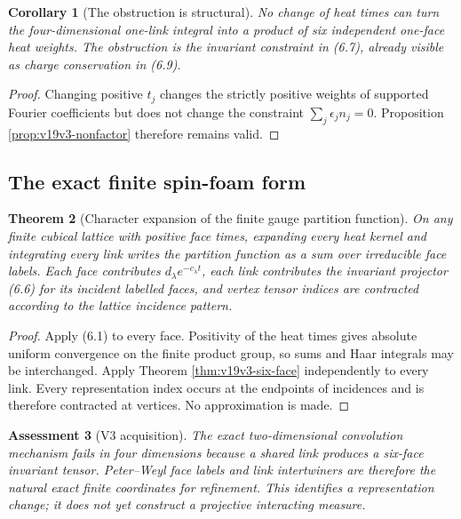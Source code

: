 \documentclass[11pt]{article}
\newtheorem{theorem}{Theorem}[section]
\newtheorem{corollary}[theorem]{Corollary}
\newtheorem{assessment}[theorem]{Assessment}
\theoremstyle{remark}
\begin{document}
\begin{corollary}[The obstruction is structural]
\label{cor:v19v3-structural}
No change of heat times can turn the four-dimensional one-link integral
into a product of six independent one-face heat weights.  The obstruction
is the invariant constraint in (6.7), already visible as charge
conservation in (6.9).
\end{corollary}

\begin{proof}
Changing positive \(t_j\) changes the strictly positive weights of supported
Fourier coefficients but does not change the constraint
\(\sum_j\epsilon_jn_j=0\).  Proposition
\ref{prop:v19v3-nonfactor} therefore remains valid.
\end{proof}

\subsection{The exact finite spin-foam form}

\begin{theorem}[Character expansion of the finite gauge partition function]
\label{thm:v19v3-spin-foam}
On any finite cubical lattice with positive face times, expanding every
heat kernel and integrating every link writes the partition function as a
sum over irreducible face labels.  Each face contributes
\(d_\lambda e^{-c_\lambda t}\), each link contributes the invariant
projector (6.6) for its incident labelled faces, and vertex tensor indices
are contracted according to the lattice incidence pattern.
\end{theorem}

\begin{proof}
Apply (6.1) to every face.  Positivity of the heat times gives absolute
uniform convergence on the finite product group, so sums and Haar integrals
may be interchanged.  Apply Theorem \ref{thm:v19v3-six-face} independently
to every link.  Every representation index occurs at the endpoints of
incidences and is therefore contracted at vertices.  No approximation is
made.
\end{proof}

\begin{assessment}[V3 acquisition]
\label{ass:v19v3}
The exact two-dimensional convolution mechanism fails in four dimensions
because a shared link produces a six-face invariant tensor.  Peter--Weyl
face labels and link intertwiners are therefore the natural exact finite
coordinates for refinement.  This identifies a representation change; it
does not yet construct a projective interacting measure.
\end{assessment}
\end{document}
